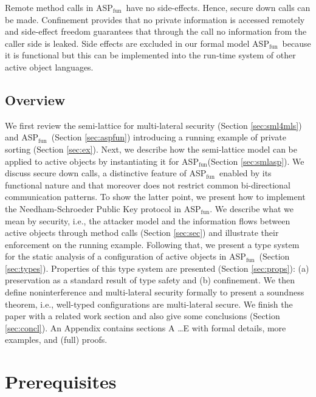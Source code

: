 \documentclass[10pt, conference, compsocconf]{IEEEtran}
\newcommand\aspfun{ASP${}_\text{fun}$\ }
\newcommand\aspfunp{ASP${}_\text{fun}$}
\begin{document}
Remote method calls in \aspfun have no side-effects. Hence, secure down calls can be made.
Confinement provides that no private information is accessed remotely and side-effect freedom
guarantees that through the call no information from the caller side is leaked.
Side effects are excluded in our formal model \aspfun because it is functional 
but this can be implemented into the run-time system of other active object languages.

\subsection*{Overview}
We first review the semi-lattice for multi-lateral security 
(Section \ref{sec:sml4mls}) and \aspfun (Section \ref{sec:aspfun}) introducing
a running example of private sorting (Section \ref{sec:ex}).
Next, we describe how the semi-lattice model can be applied to active
objects by instantiating it for \aspfunp (Section \ref{sec:smlasp}). We 
discuss secure down calls, a distinctive feature of \aspfun enabled by 
its functional nature and that moreover does not restrict common bi-directional
communication patterns. To show the latter point, we present
how to implement the Needham-Schroeder Public Key protocol in \aspfunp.
We describe what we mean by security, i.e., the attacker model and the information 
flows between active objects through method calls (Section \ref{sec:sec}) and illustrate
their enforcement on the running example.
Following that, we present a type system for the static analysis of a configuration of 
active objects in \aspfun (Section \ref{sec:types}). Properties of this type system are 
presented  (Section \ref{sec:props}): 
(a) preservation as a standard result of type safety and (b) confinement.
We then define noninterference and multi-lateral security formally to present a soundness
theorem, i.e., well-typed configurations are multi-lateral secure.
We finish the paper with a related work section and also give some conclusions 
(Section \ref{sec:concl}).
An Appendix contains sections A \dots E with formal details, more examples, and (full) proofs.

\section{Prerequisites}
\label{sec:prereq}
\end{document}
